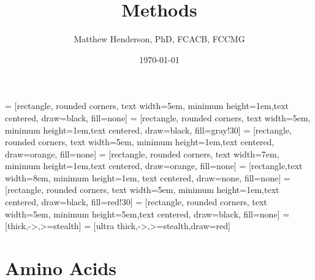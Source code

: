 \documentclass[12pt]{scrartcl}
\author{Matthew Henderson, PhD, FCACB, FCCMG}
\date{\today}
\title{Methods}
\begin{document}
\maketitle
\setcounter{tocdepth}{2}
\tableofcontents


 = [rectangle, rounded corners, text width=5em, minimum height=1em,text centered, draw=black, fill=none]
 = [rectangle, rounded corners, text width=5em, minimum height=1em,text centered, draw=black, fill=gray!30]
 = [rectangle, rounded corners, text width=5em, minimum height=1em,text centered, draw=orange, fill=none]
 = [rectangle, rounded corners, text width=7em, minimum height=1em,text centered, draw=orange, fill=none]
 = [rectangle,text width=8em, minimum height=1em, text centered, draw=none, fill=none]
 = [rectangle, rounded corners, text width=5em, minimum height=1em,text centered, draw=black, fill=red!30]
 = [rectangle, rounded corners, text width=5em, minimum height=5em,text centered, draw=black, fill=none]
 = [thick,->,>=stealth]
 = [ultra thick,->,>=stealth,draw=red]

\section{Amino Acids}
\label{sec:orgabae395}
\end{document}
